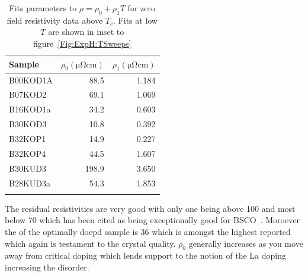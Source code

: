 \begin{table}
	\begin{center}
       	\caption{Fits parameters to $\rho = \rho_0 + \rho_1T$ for zero field resistivity data above $T_c$. Fits at low $T$ are shown in inset to figure~\ref{Fig:ExpH:TSweeps}}
		\begin{tabular}[htbp]{lrr}
\toprule
Sample		& $\rho_0 (\unit{\micro\ohm\centi\metre})$	& $\rho_1 (\unit{\micro\ohm\centi\metre})$	\\
\midrule
B00KOD1A	& 88.5		& 1.184		\\
B07KOD2		& 69.1		& 1.069		\\
B16KOD1a	& 34.2		& 0.603		\\
B30KOD3		& 10.8		& 0.392		\\
B32KOP1		& 14.9		& 0.227		\\
B32KOP4		& 44.5		& 1.607 	\\
B30KUD3		& 198.9		& 3.650	    \\
B28KUD3a	& 54.3		& 1.853 	\\
\bottomrule
		\label{Table:ExpH:TSweepFitsParams}
		\end{tabular}
	\end{center}
\end{table}
The residual resistivities are very good with only one being above \unit{100}{\micro\ohm\centi\metre} and most below \unit{70}{\micro\ohm\centi\metre} which has been cited as being exceptionally good for \ac{BSCO}~\cite{Ando1999}. Moroever the \Tc of the optimally doepd sample is \unit{36}{\kelvin} which is amongst the highest reported~\cite{Ando1999} which again is testament to the crystal quality. $\rho_0$ generally increases as you move away from critical doping which lends support to the notion of the La doping increasing the disorder.




